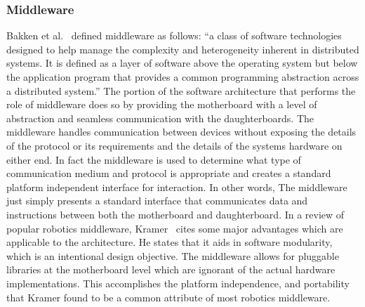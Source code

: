 	\subsubsection{Middleware} %
	\label{ssub:middleware}
	Bakken et al.~\parencite{bakken2001middleware} defined middleware as follows: ``a class of software technologies designed to help manage the complexity and heterogeneity inherent in distributed systems. It is defined as a layer of software above the operating system but below the application program that provides a common programming abstraction across a distributed system.'' The portion of the \xten software architecture that performs the role of middleware does so by providing the motherboard with a level of abstraction and seamless communication with the daughterboards. The middleware handles communication between devices without exposing the details of the protocol or its requirements and the details of the systems hardware on either end. In fact the middleware is used to determine what type of communication medium and protocol is appropriate and creates a standard platform independent interface for interaction. In other words, The middleware just simply presents a standard interface that communicates data and instructions between both the motherboard and daughterboard.
	In a review of popular robotics middleware, Kramer~\parencite{kramer} cites some major advantages which are applicable to the \xten architecture. He states that it aids in software modularity, which is an intentional design objective. The middleware allows for pluggable libraries at the motherboard level which are ignorant of the actual hardware implementations. This accomplishes the platform independence, and portability that Kramer found to be a common attribute of most robotics middleware.
	

